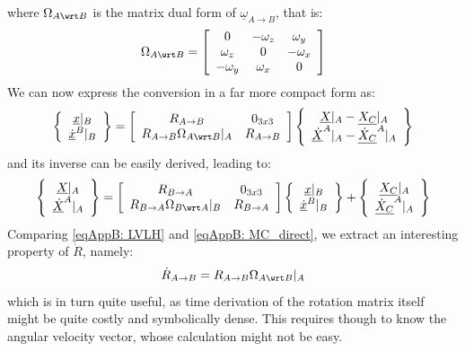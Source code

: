 	\noindent where $\Omega_{A\wrt B}$ is the matrix dual form of $\underline{\omega}_{A \to B}$, that is:
	\[
	\Omega_{A\wrt B} = \left[ \begin{array}{ccc}
			0 			& -\omega_z & \omega_y \\
			\omega_z 	& 0 		& -\omega_x \\
			-\omega_y 	& \omega_x 	& 0
			\end{array}\right]
	\]
	\indent We can now express the conversion in a far more compact form as:
	\begin{equation}
	\left\{ \begin{array}{c}
	\underline{x}\rvert_{B} \\
	\underline{\dot{x}}^{B}\rvert_{B}
	\end{array} \right\}
	= 
	\left[\begin{array}{cc}
	R_{A\to B} 								& 0_{3x3} \\
	R_{A\to B} \Omega_{A \wrt B} \rvert_{A} & R_{A\to B} 
	\end{array}\right]
	\left\{ \begin{array}{c}
	\underline{X}\rvert_{A} - \underline{X_C}\rvert_{A}\\
	\underline{\dot{X}}^{A}\rvert_{A} - \underline{\dot{X}_C}^{A}\rvert_{A}
	\end{array}\right\}
	\label{eqAppB: 	MC_direct}
	\end{equation}
	\noindent and its inverse can be easily derived, leading to:
	\begin{equation}
	\left\{ \begin{array}{c}
	\underline{X}\rvert_{A} \\
	\underline{\dot{X}}^{A}\rvert_{A}
	\end{array} \right\}
	= 
	\left[\begin{array}{cc}
	R_{B\to A} & 0_{3x3} \\
	R_{B\to A} \Omega_{B\wrt A} \rvert_{B} & R_{B\to A} 
	\end{array}\right]
	\left\{ \begin{array}{c}
	\underline{x}\rvert_{B} \\
	\underline{\dot{x}}^{B}\rvert_{B}
	\end{array}\right\} + 
	\left\{ \begin{array}{c}
	\underline{X_C}\rvert_{A} \\
	\underline{\dot{X}_C}^{A}\rvert_{A}
	\end{array} \right\}
	\label{eqAppB: 	MC_inverse}
	\end{equation}
	\indent Comparing \eqref{eqAppB: 	LVLH} and \eqref{eqAppB: 	MC_direct}, we extract an interesting property of $\dot{R}$, namely:
	\[
	\dot{R}_{A \to B} = R_{A\to B} \Omega_{A \wrt B} \rvert_{A}
	\]
	\noindent which is in turn quite useful, as time derivation of the rotation matrix itself might be quite costly and symbolically dense. This requires though to know the angular velocity vector, whose calculation might not be easy.
